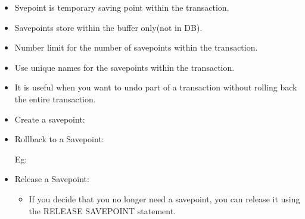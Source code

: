 
\begin{flushleft}
	
	\begin{itemize}
		\item Svepoint is temporary saving point within the transaction.
		\item Savepoints store within the buffer only(not in DB).
		\item Number limit for the number of savepoints within the transaction.
		\item Use unique names for the savepoints within the transaction.
		\item It is useful when you want to undo part of a transaction without rolling back the entire transaction. 
		\item Create a savepoint:
		\item Rollback to a Savepoint:
		\bigskip
		
		Eg:
		\bigskip
		\bigskip
		\newpage
		\item Release a Savepoint: 
		\begin{itemize}
			\item If you decide that you no longer need a savepoint, you can release it using the RELEASE SAVEPOINT statement.
			\bigskip
		\end{itemize}
	\end{itemize}

\end{flushleft}

